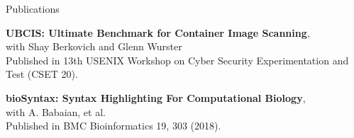 \documentclass{cv}
\begin{document}
\begin{rSection}{Publications}
\begin{rSubsectionPure}
	\item \textbf{{UBCIS}: Ultimate Benchmark for Container Image Scanning}, \\
	with Shay Berkovich and Glenn Wurster \\
	Published in 13th {USENIX} Workshop on Cyber Security Experimentation and Test ({CSET} 20). 
\end{rSubsectionPure}

\begin{rSubsectionPure}
	\item \textbf{bioSyntax: Syntax Highlighting For Computational Biology}, \\
	with A. Babaian, et al. \\
	Published in BMC Bioinformatics 19, 303 (2018). 
\end{rSubsectionPure}
\end{rSection}


\end{document}
